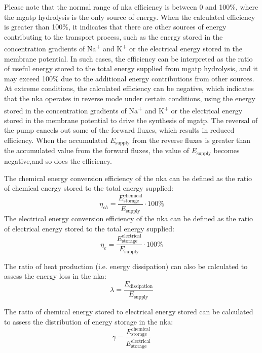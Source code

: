 \documentclass{biophys-new}
\begin{document}
Please note that the normal range of \gls{nka} efficiency is between 0 and 100\%, where the \gls{mgatp} hydrolysis is the only source of energy. When the calculated efficiency is greater than 100\%, it indicates that there are other sources of energy contributing to the transport process, such as the energy stored in the concentration gradients of Na\textsuperscript{+} and K\textsuperscript{+} or the electrical energy stored in the membrane potential. In such cases, the efficiency can be interpreted as the ratio of useful energy stored to the total energy supplied from \gls{mgatp} hydrolysis, and it may exceed 100\% due to the additional energy contributions from other sources. At extreme conditions, the calculated efficiency can be negative, which indicates that the \gls{nka} operates in reverse mode under certain conditions, using the energy stored in the concentration gradients of Na\textsuperscript{+} and K\textsuperscript{+} or the electrical energy stored in the membrane potential to drive the synthesis of \gls{mgatp}. The reversal of the pump cancels out some of the forward fluxes, which results in reduced efficiency. When the accumulated $E_\text{supply}$ from the reverse fluxes is greater than the accumulated value from the forward fluxes, the value of $E_\text{supply}$ becomes negative,and so does the efficiency.

The chemical energy conversion efficiency of the \gls{nka} can be defined as the ratio of chemical energy stored to the total energy supplied:
\begin{equation}
      \label{eq:chemical_efficiency}
      \eta_{ch} = \frac{E_\text{storage}^\text{chemical}}{E_\text{supply}}\cdot 100\%
\end{equation}
The electrical energy conversion efficiency of the \gls{nka} can be defined as the ratio of electrical energy stored to the total energy supplied:
\begin{equation}
      \label{eq:electrical_efficiency}
      \eta_{e} = \frac{E_\text{storage}^\text{electrical}}{E_\text{supply}}\cdot 100\%
\end{equation}

The ratio of heat production (i.e. energy dissipation) can also be calculated to assess the energy loss in the \gls{nka}:
\begin{equation}
      \label{eq:energy_loss}
      \lambda = \frac{E_\text{dissipation}}{E_\text{supply}}
\end{equation}

The ratio of chemical energy stored to electrical energy stored can be calculated to assess the distribution of energy storage in the \gls{nka}:
\begin{equation}
      \label{eq:energy_distribution}
      \gamma = \frac{E_\text{storage}^\text{chemical}}{E_\text{storage}^\text{electrical}}
\end{equation}
\end{document}
